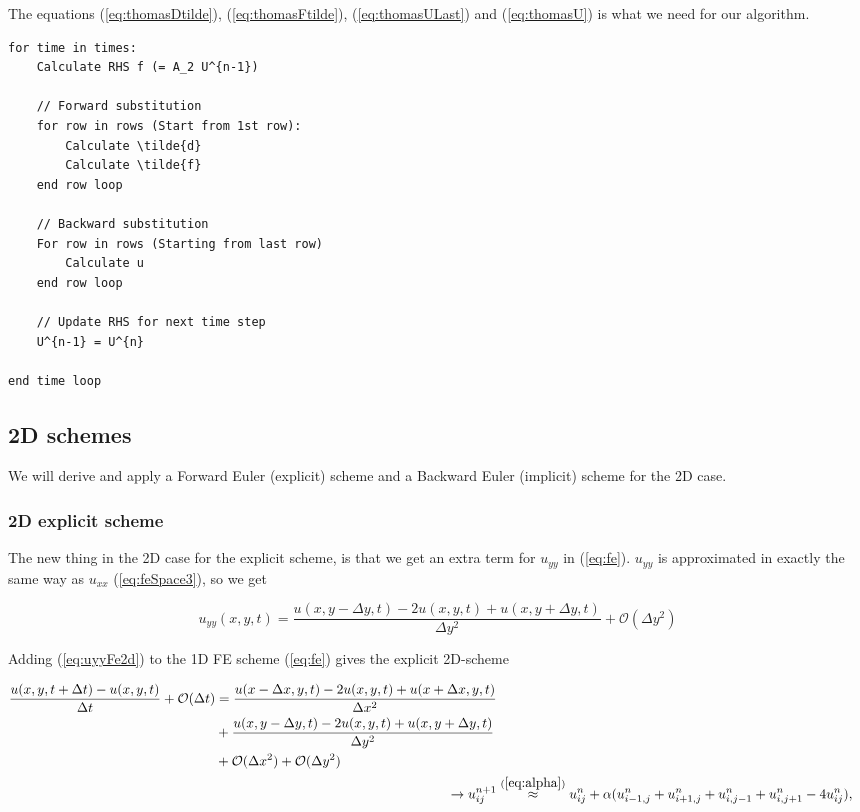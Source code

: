 \documentclass{article}
\begin{document}
The equations (\ref{eq:thomasDtilde}), (\ref{eq:thomasFtilde}), (\ref{eq:thomasULast}) and (\ref{eq:thomasU}) is what we need for our algorithm.

\begin{lstlisting}
for time in times:
	Calculate RHS f (= A_2 U^{n-1})
	
	// Forward substitution
	for row in rows (Start from 1st row):
		Calculate \tilde{d}
		Calculate \tilde{f}
	end row loop
	
	// Backward substitution
	For row in rows (Starting from last row)
		Calculate u
	end row loop

	// Update RHS for next time step
	U^{n-1} = U^{n}

end time loop
\end{lstlisting}

\subsection{2D schemes}
We will derive and apply a Forward Euler (explicit) scheme and a Backward Euler (implicit) scheme for the 2D case.

\subsubsection{2D explicit scheme}
The new thing in the 2D case for the explicit scheme, is that we get an extra term for $u_{yy}$ in (\ref{eq:fe}). $u_{yy}$ is approximated in exactly the same way as $u_{xx}$ (\ref{eq:feSpace3}), so we get

\begin{equation}
	 u_{yy}(x,y,t) = \frac{u(x,y - \Delta y, t) - 2u(x,y,t) + u(x,y+ \Delta y, t)}{\Delta y^2} + \mathcal{O}(\Delta y^2)\label{eq:uyyFe2d}
\end{equation}

Adding (\ref{eq:uyyFe2d}) to the 1D FE scheme (\ref{eq:fe}) gives the explicit 2D-scheme

\begin{subequations}
	\begin{align}
		\begin{split}
			\frac{u(x,y, t+ \Delta t) - u(x,y,t)}{\Delta t} + \mathcal{O}(\Delta t) &= 
			\frac{u(x - \Delta x, y,t) - 2u(x,y,t) + u(x+ \Delta x,y, t)}{\Delta x^2} \\
			&+  \frac{u(x,y - \Delta y, t) - 2u(x,y,t) + u(x,y+ \Delta y, t)}{\Delta y^2} \\
			&+ \mathcal{O}(\Delta x^2)  + \mathcal{O}(\Delta y^2)
		\end{split}\\
		\rightarrow u_{ij}^{n+1} &\stackrel{(\ref{eq:alpha})}{\approx} u_{ij}^{n} + \alpha (u_{i-1,j}^n + u_{i+1,j}^n + u_{i,j-1}^n + u_{i,j+1}^n - 4u_{ij}^n),\label{eq:Fe2d}
	\end{align}
\end{subequations}
\end{document}
